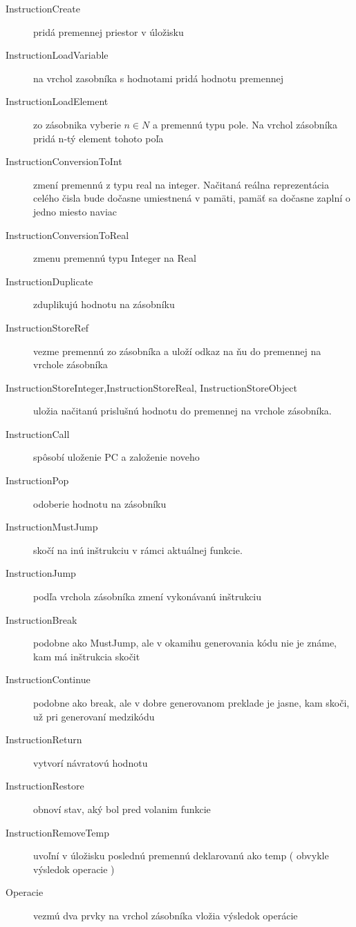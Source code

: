 \begin{description} %
\item[InstructionCreate] pridá premennej priestor v úložisku
\item[InstructionLoadVariable] na vrchol zasobníka s hodnotami pridá hodnotu premennej
\item[InstructionLoadElement] zo zásobnika vyberie $n \in N$ a premennú typu pole. Na vrchol zásobníka pridá n-tý element tohoto poľa
\item[InstructionConversionToInt] zmení premennú z typu real na integer. Načitaná reálna reprezentácia celého čisla bude dočasne umiestnená v pamäti, pamäť sa dočasne zaplní o jedno miesto naviac %
\item[InstructionConversionToReal] zmenu premennú typu Integer na Real
\item[InstructionDuplicate] zduplikujú hodnotu na zásobníku
\item[InstructionStoreRef] vezme premennú zo zásobníka a uloží odkaz na ňu do premennej na vrchole zásobníka %
\item[InstructionStoreInteger,InstructionStoreReal, InstructionStoreObject] uložia načitanú prislušnú hodnotu do premennej na vrchole zásobníka.
\item[InstructionCall] spôsobí uloženie PC %
a založenie noveho
\item[InstructionPop ] odoberie hodnotu na zásobníku
\item[InstructionMustJump] skočí na inú inštrukciu v rámci aktuálnej funkcie.
\item[InstructionJump] podľa vrchola zásobníka zmení vykonávanú inštrukciu
\item[InstructionBreak] podobne ako MustJump, ale v okamihu generovania kódu nie je známe, kam má inštrukcia skočit
\item[InstructionContinue ] podobne ako break, ale v dobre generovanom preklade je jasne, kam skoči, už pri generovaní medzikódu
\item[InstructionReturn] vytvorí návratovú hodnotu
\item [InstructionRestore] obnoví stav, aký bol pred volanim funkcie
\item [InstructionRemoveTemp] uvoľní v úložisku poslednú premennú deklarovanú ako temp ( obvykle výsledok operacie )
\item [Operacie] vezmú dva prvky na vrchol zásobníka vložia výsledok operácie
\begin{description}

\end{description}
\end{description}
